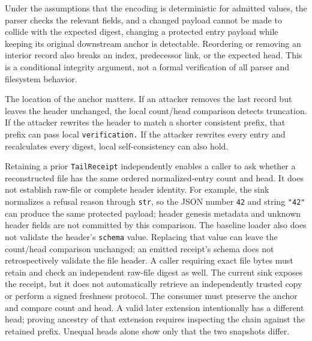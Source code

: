 \documentclass[
  11pt,
]{article}
\newcommand{\passthrough}[1]{#1}
\begin{document}
Under the assumptions that the encoding is deterministic for admitted
values, the parser checks the relevant fields, and a changed payload
cannot be made to collide with the expected digest, changing a protected
entry payload while keeping its original downstream anchor is
detectable. Reordering or removing an interior record also breaks an
index, predecessor link, or the expected head. This is a conditional
integrity argument, not a formal verification of all parser and
filesystem behavior.

The location of the anchor matters. If an attacker removes the last
record but leaves the header unchanged, the local count/head comparison
detects truncation. If the attacker rewrites the header to match a
shorter consistent prefix, that prefix can pass local
\nolinkurl{verification.} If the attacker rewrites every entry and
recalculates every digest, local self-consistency can also hold.

Retaining a prior \passthrough{\lstinline!TailReceipt!} independently
enables a caller to ask whether a reconstructed file has the same
ordered normalized-entry count and head. It does not establish raw-file
or complete header identity. For example, the sink normalizes a refusal
reason through \passthrough{\lstinline!str!}, so the JSON number
\passthrough{\lstinline!42!} and string \passthrough{\lstinline!"42"!}
can produce the same protected payload; header genesis metadata and
unknown header fields are not committed by this comparison. The baseline
loader also does not validate the header's
\passthrough{\lstinline!schema!} value. Replacing that value can leave
the count/head comparison unchanged; an emitted receipt's schema does
not retrospectively validate the file header. A caller requiring exact
file bytes must retain and check an independent raw-file digest as well.
The current sink exposes the receipt, but it does not automatically
retrieve an independently trusted copy or perform a signed freshness
protocol. The consumer must preserve the anchor and compare count and
head. A valid later extension intentionally has a different head;
proving ancestry of that extension requires inspecting the chain against
the retained prefix. Unequal heads alone show only that the two
snapshots differ.
\end{document}
